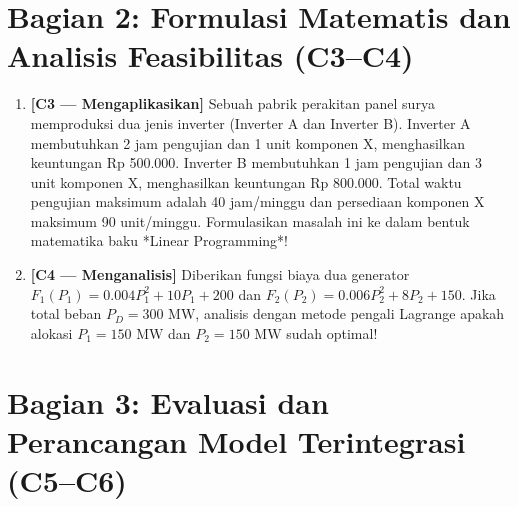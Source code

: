 \documentclass[11pt,a4paper]{article}
\begin{document}
\section*{Bagian 2: Formulasi Matematis dan Analisis Feasibilitas (C3--C4)}

\begin{enumerate}[label=\textbf{Soal \arabic*:}, leftmargin=*, resume]
    \item \textbf{[C3 --- Mengaplikasikan]} Sebuah pabrik perakitan panel surya memproduksi dua jenis inverter (Inverter A dan Inverter B). Inverter A membutuhkan 2 jam pengujian dan 1 unit komponen X, menghasilkan keuntungan Rp 500.000. Inverter B membutuhkan 1 jam pengujian dan 3 unit komponen X, menghasilkan keuntungan Rp 800.000. Total waktu pengujian maksimum adalah 40 jam/minggu dan persediaan komponen X maksimum 90 unit/minggu.
    Formulasikan masalah ini ke dalam bentuk matematika baku *Linear Programming*!
    
    \begin{tcolorbox}[colback=white,colframe=gray!50,height=5cm,title=Ruang Jawaban Soal 3]
    \end{tcolorbox}

    \item \textbf{[C4 --- Menganalisis]} Diberikan fungsi biaya dua generator $F_1(P_1) = 0.004 P_1^2 + 10 P_1 + 200$ dan $F_2(P_2) = 0.006 P_2^2 + 8 P_2 + 150$. Jika total beban $P_D = 300\text{ MW}$, analisis dengan metode pengali Lagrange apakah alokasi $P_1 = 150\text{ MW}$ dan $P_2 = 150\text{ MW}$ sudah optimal!
    
    \begin{tcolorbox}[colback=white,colframe=gray!50,height=5.5cm,title=Ruang Jawaban Soal 4]
    \end{tcolorbox}
\end{enumerate}

\section*{Bagian 3: Evaluasi dan Perancangan Model Terintegrasi (C5--C6)}
\end{document}
